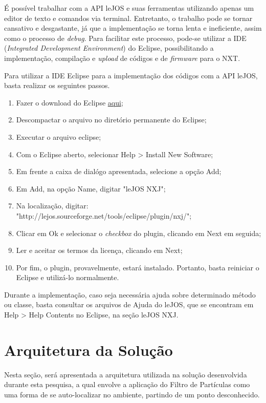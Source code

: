 	É possível trabalhar com a API leJOS e suas ferramentas utilizando apenas um editor de texto e comandos via terminal. Entretanto, o trabalho pode se tornar cansativo e
	desgastante, já que a implementação se torna lenta e ineficiente, assim como o processo de \textit{debug}. Para facilitar este processo, pode-se utilizar
	a IDE (\textit{Integrated Development Environment}) do Eclipse, possibilitando a implementação, compilação e \textit{upload} de códigos e de \textit{firmware} para o NXT.

	Para utilizar a IDE Eclipse para a implementação dos códigos com a API leJOS, basta realizar os seguintes passos.

	\begin{enumerate}
		\item Fazer o download do Eclipse \href{www.eclipse.org}{aqui};
		\item Descompactar o arquivo no diretório permanente do Eclipse;
		\item Executar o arquivo eclipse;
		\item Com o Eclipse aberto, selecionar Help > Install New Software;
		\item Em frente a caixa de dialógo apresentada, selecione a opção Add;
		\item Em Add, na opção Name, digitar "leJOS NXJ";
		\item Na localização, digitar: "http://lejos.sourceforge.net/tools/eclipse/plugin/nxj/";
		\item Clicar em Ok e selecionar o \textit{checkbox} do plugin, clicando em Next em seguida;
		\item Ler e aceitar os termos da licença, clicando em Next;
		\item Por fim, o plugin, provavelmente, estará instalado. Portanto, basta reiniciar o Eclipse e utilizá-lo normalmente.
	\end{enumerate}

	Durante a implementação, caso seja necessária ajuda sobre determinado método ou classe, basta consultar os arquivos de Ajuda do leJOS, que se encontram em
	Help > Help Contents no Eclipse, na seção leJOS NXJ.

\section{Arquitetura da Solução}
\label{sec:arq_solucao}

	Nesta seção, será apresentada a arquitetura utilizada na solução desenvolvida durante esta pesquisa, a qual envolve a aplicação do Filtro
	de Partículas como uma forma de se auto-localizar no ambiente, partindo de um ponto desconhecido.

